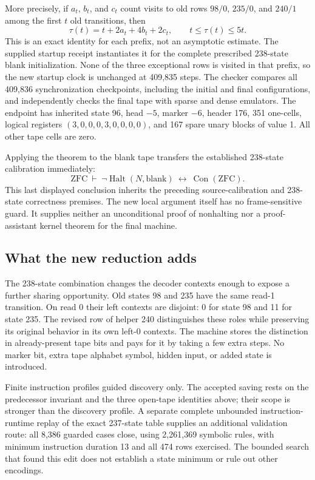 More precisely, if $a_t$, $b_t$, and $c_t$ count visits to old rows
$98/0$, $235/0$, and $240/1$ among the first $t$ old transitions, then
\[
 \tau(t)=t+2a_t+4b_t+2c_t,
 \qquad t\le\tau(t)\le5t.
\]
This is an exact identity for each prefix, not an asymptotic estimate.
The supplied startup receipt instantiates it for the complete prescribed
238-state blank initialization.  None of the three exceptional rows is
visited in that prefix, so the new startup clock is unchanged at 409,835
steps.  The checker compares all 409,836 synchronization checkpoints,
including the initial and final configurations, and independently checks
the final tape with sparse and dense emulators.  The endpoint has inherited
state 96, head $-5$, marker $-6$, header 176, 351 one-cells, logical registers
$(3,0,0,0,3,0,0,0,0)$, and 167 spare unary blocks of value 1.  All other tape
cells are zero.

Applying the theorem to the blank tape transfers the established 238-state
calibration immediately:
\[
 \mathrm{ZFC}\ \vdash\
 \neg\operatorname{Halt}(N,\mathrm{blank})
 \ \longleftrightarrow\ \operatorname{Con}(\mathrm{ZFC}).
\]
This last displayed conclusion inherits the preceding source-calibration
and 238-state correctness premises.  The new local argument itself has no
frame-sensitive guard.  It supplies neither an unconditional proof of
nonhalting nor a proof-assistant kernel theorem for the final machine.

\subsection{What the new reduction adds}

The 238-state combination changes the decoder contexts enough to expose a
further sharing opportunity.  Old states 98 and 235 have the same read-1
transition.  On read 0 their left contexts are disjoint: 0 for state 98 and
11 for state 235.  The revised row of helper 240 distinguishes these roles
while preserving its original behavior in its own left-0 contexts.
The machine stores the distinction in already-present tape bits and pays
for it by taking a few extra steps.  No marker bit, extra tape alphabet
symbol, hidden input, or added state is introduced.

Finite instruction profiles guided discovery only.  The accepted saving
rests on the predecessor invariant and the three open-tape identities above;
their scope is stronger than the discovery profile.  A separate complete
unbounded instruction-runtime replay of the exact 237-state table supplies
an additional validation route: all 8,386 guarded cases close, using
2,261,369 symbolic rules, with minimum instruction duration 13 and all 474
rows exercised.  The bounded search that found this edit
does not establish a state minimum or rule out other encodings.
